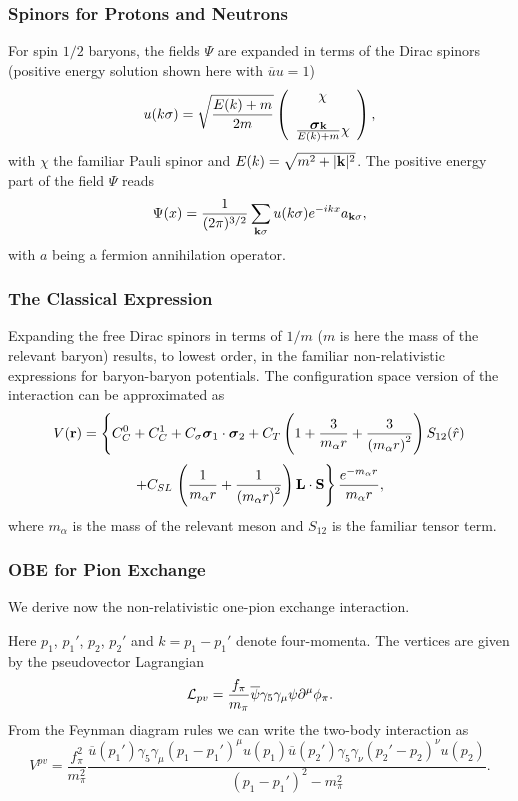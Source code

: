 \documentclass[compress]{beamer}
\begin{document}
\frame
{
\frametitle{Spinors for Protons and Neutrons}
For spin $1/2$ baryons, the fields $\Psi$ are expanded
in terms of the Dirac spinors (positive energy
solution shown here with $\overline{u}u=1$)
\[
   u(k\sigma)=\sqrt{\frac{E(k)+m}{2m}}
	  \left(\begin{array}{c} \chi\\ \\
	  \frac{\mbox{\boldmath $\sigma$}{\bf k}}{E(k)+m}\chi
	  \end{array}\right), 
   \label{eq:freespinor}
\]
with $\chi$ the familiar Pauli spinor and $E(k) =\sqrt{m^2 +|{\bf k}|^2}$. 
The positive energy part of the field $\Psi$ reads
\[
\Psi (x)={\displaystyle \frac{1}{(2\pi )^{3/2}}
        \sum_{{\bf k}\sigma}u(k\sigma)e^{-ikx}a_{{\bf k}\sigma}},
\]
with $a$ being a fermion annihilation operator.
}


\frame
{
\frametitle{The Classical Expression}
Expanding the free Dirac spinors
in terms of $1/m$ ($m$ is here the mass of the relevant baryon) 
results, to lowest order, in the familiar non-relativistic
expressions for baryon-baryon potentials.
The configuration space version of the interaction can be approximated as
\[
V({\bf r})= \left\{ C^0_C + C^1_C + C_\sigma 
\mbox{\boldmath $\sigma$}_1\cdot\mbox{\boldmath $\sigma$}_2
 + C_T \left( 1 + {3\over m_\alpha r} + {3\over
\left(m_\alpha r\right)^2}
\right) S_{12} (\hat r)\right.
\]
\[
+ C_{SL}\left. \left( {1\over m_\alpha r} + {1\over \left( m_\alpha r\right)^2}
\right) {\bf L}\cdot {\bf S}
\right\} \frac{e^{-m_\alpha r}}{m_\alpha r},
\]
where $m_{\alpha}$ is the mass of the relevant meson and
$S_{12}$ is the familiar tensor term.
}



\frame
{
\frametitle{OBE for Pion Exchange}
We derive now the non-relativistic one-pion exchange interaction.

Here $p_{1}$, $p_{1}'$, $p_{2}$, $p_{2}'$ and $k=p_{1}-p_{1}'$ denote 
four-momenta.  
The vertices are 
given by the pseudovector Lagrangian
\[
{\cal L}_{pv}=\frac{f_{\pi}}{m_{\pi}}\overline{\psi}\gamma_{5}\gamma_{\mu}
\psi\partial^{\mu}\phi_{\pi}.
\]
 From the Feynman diagram rules we can write the two-body interaction as  
\[
V^{pv}=\frac{f_{\pi}^{2}}{m_{\pi}^{2}}\frac{\overline{u}(p_{1}')\gamma_{5}
\gamma_{\mu}(p_{1}-p_{1}')^{\mu}u(p_{1})\overline{u}(p_{2}')\gamma_{5}
\gamma_{\nu}(p_{2}'-p_{2})^{\nu}u(p_{2})}{(p_{1}-p_{1}')^{2}-m_{\pi}^{2}}.
\]
}
\end{document}
